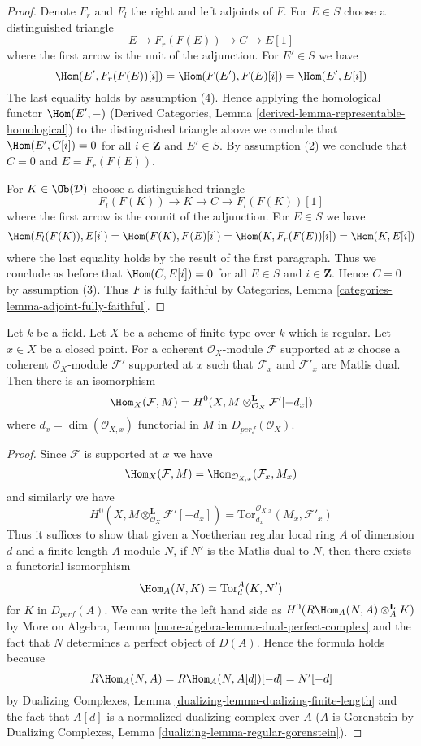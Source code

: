 \begin{proof}
Denote $F_r$ and $F_l$ the right and left adjoints of $F$. For
$E \in S$ choose a distinguished triangle
$$
E \to F_r(F(E)) \to C \to E[1]
$$
where the first arrow is the unit of the adjunction. For $E' \in S$ we have
$$
\Hom(E', F_r(F(E))[i]) = \Hom(F(E'), F(E)[i]) = \Hom(E', E[i])
$$
The last equality holds by assumption (4).
Hence applying the homological functor $\Hom(E', -)$
(Derived Categories, Lemma \ref{derived-lemma-representable-homological})
to the distinguished triangle above we conclude that $\Hom(E', C[i]) = 0$
for all $i \in \mathbf{Z}$ and $E' \in S$. By assumption (2) we conclude
that $C = 0$ and $E = F_r(F(E))$.

\medskip\noindent
For $K \in \Ob(\mathcal{D})$ choose a distinguished triangle
$$
F_l(F(K)) \to K \to C \to F_l(F(K))[1]
$$
where the first arrow is the counit of the adjunction. For $E \in S$
we have
$$
\Hom(F_l(F(K)), E[i]) = \Hom(F(K), F(E)[i]) =
\Hom(K, F_r(F(E))[i]) = \Hom(K, E[i])
$$
where the last equality holds by the result of the first paragraph.
Thus we conclude as before that $\Hom(C, E[i]) = 0$ for all $E \in S$
and $i \in \mathbf{Z}$. Hence $C = 0$ by assumption (3).
Thus $F$ is fully faithful by Categories, Lemma
\ref{categories-lemma-adjoint-fully-faithful}.
\end{proof}

\begin{lemma}
\label{lemma-duality-at-point}
Let $k$ be a field. Let $X$ be a scheme of finite type over $k$ which
is regular. Let $x \in X$ be a closed point. For a coherent
$\mathcal{O}_X$-module $\mathcal{F}$ supported at $x$ choose
a coherent $\mathcal{O}_X$-module $\mathcal{F}'$ supported at $x$
such that $\mathcal{F}_x$ and $\mathcal{F}'_x$ are Matlis dual.
Then there is an isomorphism
$$
\Hom_X(\mathcal{F}, M) =
H^0(X, M \otimes_{\mathcal{O}_X}^\mathbf{L} \mathcal{F}'[-d_x])
$$
where $d_x = \dim(\mathcal{O}_{X, x})$
functorial in $M$ in $D_{perf}(\mathcal{O}_X)$.
\end{lemma}

\begin{proof}
Since $\mathcal{F}$ is supported at $x$ we have
$$
\Hom_X(\mathcal{F}, M) =
\Hom_{\mathcal{O}_{X, x}}(\mathcal{F}_x, M_x)
$$
and similarly we have
$$
H^0(X, M \otimes_{\mathcal{O}_X}^\mathbf{L} \mathcal{F}'[-d_x]) =
\text{Tor}^{\mathcal{O}_{X, x}}_{d_x}(M_x, \mathcal{F}'_x)
$$
Thus it suffices to show that given a Noetherian regular local ring $A$
of dimension $d$ and a finite length $A$-module $N$, if
$N'$ is the Matlis dual to $N$, then there exists a functorial isomorphism
$$
\Hom_A(N, K) = \text{Tor}^A_d(K, N')
$$
for $K$ in $D_{perf}(A)$. We can write the left hand side as
$H^0(R\Hom_A(N, A) \otimes_A^\mathbf{L} K)$ by
More on Algebra, Lemma \ref{more-algebra-lemma-dual-perfect-complex}
and the fact that $N$ determines a perfect object of $D(A)$.
Hence the formula holds because
$$
R\Hom_A(N, A) = R\Hom_A(N, A[d])[-d] = N'[-d]
$$
by Dualizing Complexes, Lemma \ref{dualizing-lemma-dualizing-finite-length}
and the fact that $A[d]$ is a normalized dualizing complex over $A$
($A$ is Gorenstein by
Dualizing Complexes, Lemma \ref{dualizing-lemma-regular-gorenstein}).
\end{proof}


